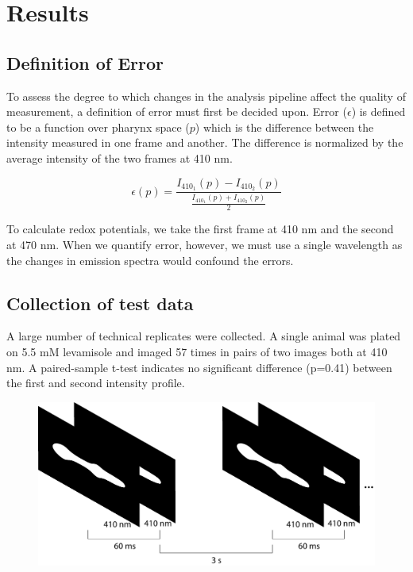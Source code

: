 
\chapter{Results} %

\label{Chapter3} %

\section{Definition of Error}
To assess the degree to which changes in the analysis pipeline affect the quality of measurement, a definition of error must first be decided upon. Error ($\epsilon$) is defined to be a function over pharynx space ($p$) which is the difference between the intensity measured in one frame and another. The difference is normalized by the average intensity of the two frames at 410 nm.


\[\epsilon(p) = \frac{I_{410_1}(p) - I_{410_2}(p)}{\frac{I_{410_1}(p) + I_{410_2}(p)}{2}}\]

To calculate redox potentials, we take the first frame at 410 nm and the second at 470 nm. When we quantify error, however, we must use a single wavelength as the changes in emission spectra would confound the errors.

\section{Collection of test data} \label{testCollection}

A large number of technical replicates were collected. A single animal was plated on 5.5 mM levamisole and imaged 57 times in pairs of two images both at 410 nm. A paired-sample t-test indicates no significant difference (p=0.41) between the first and second intensity profile.

\begin{figure}[ht]
    \centering
    \includegraphics[scale=0.5]{Figures/rendered_files/test_imaging_schematic}
    \decoRule
    \caption[Test imaging schematic]{}
    \label{fig:TestImagingSchematic}
\end{figure}

